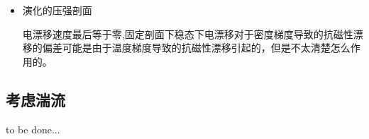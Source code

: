 \documentclass[11pt,a4paper]{article}
\begin{document}
\begin{itemize}
	\item 演化的压强剖面
	\begin{figure}[H]
		\centering
		\caption{}		
	\end{figure}
	电漂移速度最后等于零,固定剖面下稳态下电漂移对于密度梯度导致的抗磁性漂移的偏差可能是由于温度梯度导致的抗磁性漂移引起的，但是不太清楚怎么作用的。
\end{itemize}

\subsection{考虑湍流}

to be done...
\end{document}
